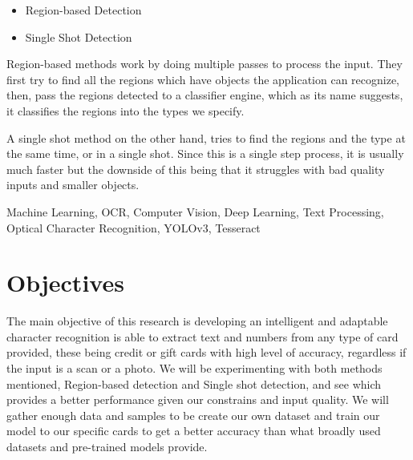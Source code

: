 \documentclass[conference]{IEEEtran}
\begin{document}
\begin{itemize}
	\item Region-based Detection
	\item Single Shot Detection
\end{itemize}

Region-based methods work by doing multiple passes to process the input. They first try to find all the regions which have objects the application can recognize, then, pass the regions detected to a classifier engine, which as its name suggests, it classifies the regions into the types we specify.

A single shot method on the other hand, tries to find the regions and the type at the same time, or in a single shot. Since this is a single step process, it is usually much faster but the downside of this being that it struggles with bad quality inputs and smaller objects.





\begin{IEEEkeywords}
  Machine Learning, OCR, Computer Vision, Deep Learning, Text Processing, Optical Character Recognition, YOLOv3, Tesseract
\end{IEEEkeywords}

%
\IEEEpeerreviewmaketitle



\section{Objectives}\label{section:Objectives}

The main objective of this research is developing an intelligent and adaptable character recognition is able to extract text and numbers from any type of card provided, these being credit or gift cards with high level of accuracy, regardless if the input is a scan or a photo.
We will be experimenting with both methods mentioned, Region-based detection and Single shot detection, and see which provides a better performance given our constrains and input quality.
We will gather enough data and samples to be create our own dataset and train our model to our specific cards to get a better accuracy than what broadly used datasets and pre-trained models provide.\\
\end{document}
